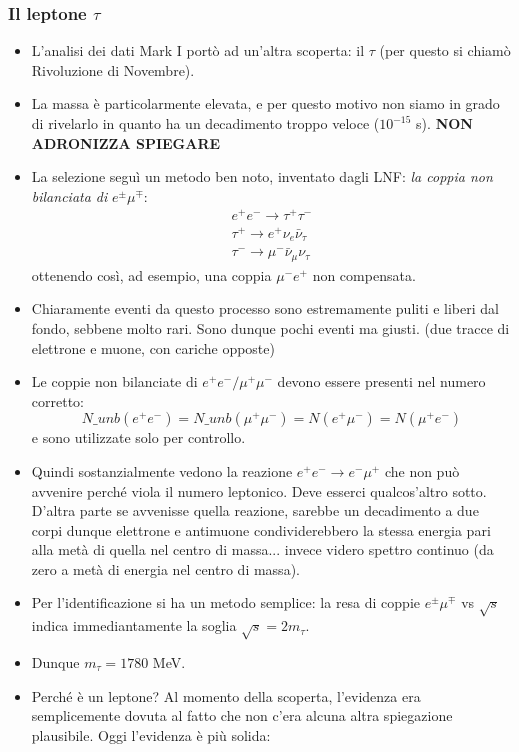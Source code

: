 \subsubsection{Il leptone $\tau$}
\begin{itemize}
    \item L'analisi dei dati Mark I portò ad un'altra scoperta: il $\tau$ (per questo si chiamò Rivoluzione di Novembre).
    \item La massa è particolarmente elevata, e per questo motivo non siamo in grado di rivelarlo in quanto ha un decadimento troppo veloce ($10^{-15}$ s). \textbf{NON ADRONIZZA SPIEGARE}
    \item La selezione seguì un metodo ben noto, inventato dagli LNF: \textit{la coppia non bilanciata di} $e^\pm\mu^\mp$:
    \begin{gather*}
    e^+e^-\to\tau^+\tau^-\\
    \tau^+\to e^+\nu_e\bar\nu_\tau\\
    \tau^-\to\mu^-\bar\nu_\mu\nu_\tau 
    \end{gather*}
    ottenendo così, ad esempio, una coppia $\mu^-e^+$ non compensata.
    \item Chiaramente eventi da questo processo sono estremamente puliti e liberi dal fondo, sebbene molto rari. Sono dunque pochi eventi ma giusti. (due tracce di elettrone e muone, con cariche opposte)
    \item Le coppie non bilanciate di $e^+e^-/\mu^+\mu^-$ devono essere presenti nel numero corretto:
    \begin{equation*}
    N\_{unb}(e^+e^-)=N\_{unb}(\mu^+\mu^-)=N(e^+\mu^-)=N(\mu^+e^-)
    \end{equation*}
    e sono utilizzate solo per controllo.
    \item Quindi sostanzialmente vedono la reazione $e^+e^-\to e^-\mu^+$ che non può avvenire perché viola il numero leptonico. Deve esserci qualcos'altro sotto. D'altra parte se avvenisse quella reazione, sarebbe un decadimento a due corpi dunque elettrone e antimuone condividerebbero la stessa energia pari alla metà di quella nel centro di massa... invece videro spettro continuo (da zero a metà di energia nel centro di massa).
    \item Per l'identificazione si ha un metodo semplice: la resa di coppie $e^\pm\mu^\mp$ vs $\sqrt s$ indica immediantamente la soglia $\sqrt s=2m_\tau$.
    \item Dunque $m_\tau=1780$ MeV. 
    \item Perché è un leptone? Al momento della scoperta, l'evidenza era semplicemente dovuta al fatto che non c'era alcuna altra spiegazione plausibile. Oggi l'evidenza è più solida:

\end{itemize}
